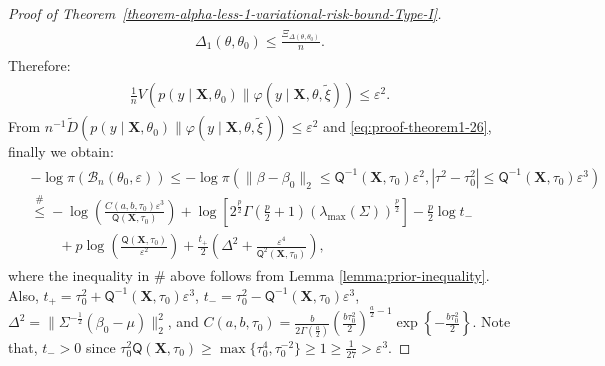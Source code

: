 \documentclass[12pt]{article}
\numberwithin{equation}{section}
\begin{document}
\begin{proof}[Proof of Theorem~\ref{theorem-alpha-less-1-variational-risk-bound-Type-I}]
\begin{align}\label{eq:proof-theorem1-25}
    \begin{split}
        \Delta_1(\theta, \theta_0) \leq \frac{\Xi_{\Delta(\theta, \theta_0)}}{n}.
    \end{split}
\end{align}
Therefore:
\begin{align}\label{eq:proof-theorem1-26}
    \begin{split}
        \frac{1}{n}V\left(p(y\mid \mathbf{X}, \theta_0) \parallel \varphi(y\mid \mathbf{X}, \theta, \tilde{\xi})\right) \leq \varepsilon^2.
    \end{split}
\end{align}
From $n^{-1}\tilde{D}\left(p(y\mid \mathbf{X}, \theta_0) \parallel \varphi(y\mid \mathbf{X}, \theta, \tilde{\xi})\right) \leq \varepsilon^2$ and \eqref{eq:proof-theorem1-26}, finally we obtain:
\begin{align}\label{eq:proof-theorem1-27}
    \begin{split}
        &-\log \pi(\mathcal{B}_n(\theta_0, \varepsilon)) \leq -\log \pi\left(\lVert \beta-\beta_0\rVert_2\leq \mathsf{Q}^{-1}(\mathbf{X}, \tau_0)\varepsilon^2, |\tau^2-\tau_0^2| \leq \mathsf{Q}^{-1}(\mathbf{X}, \tau_0)\varepsilon^{3}\right)\\
        &\stackrel{\#}{\leq} -\log\left(\frac{C(a,b,\tau_0)\varepsilon^3}{\mathsf{Q}(\mathbf{X}, \tau_0)}\right)  + \log\left[2^{\frac{p}{2}}\Gamma\left(\frac{p}{2}+1\right)\left(\lambda_{\mathrm{max}}(\Sigma)\right)^{\frac{p}{2}}\right]- \frac{p}{2}\log t_{-}\\
        &\qquad + p\log\left(\frac{\mathsf{Q}(\mathbf{X}, \tau_0)}{\varepsilon^2}\right) + \frac{t_{+}}{2}\left(\Delta^2 + \frac{\varepsilon^4}{\mathsf{Q}^{2}(\mathbf{X}, \tau_0)}\right),
    \end{split}
\end{align}
where the inequality in $\#$ above follows from Lemma \ref{lemma:prior-inequality}.
Also, $t_+ = \tau_0^2 + \mathsf{Q}^{-1}(\mathbf{X}, \tau_0)\varepsilon^3$, $t_{-} = \tau_0^2 - \mathsf{Q}^{-1}(\mathbf{X}, \tau_0)\varepsilon^3$, $\Delta^{2} = \lVert \Sigma^{-\frac{1}{2}}(\beta_0-\mu)\rVert_{2}^{2}$, and $C(a,b,\tau_0) = \frac{b}{2\Gamma\left(\frac{a}{2}\right)}\left(\frac{b \tau_0^2}{2}\right)^{\frac{a}{2}-1}\exp\left\{-\frac{b\tau_0^2}{2}\right\}$. Note that, $t_{-} > 0$ since $\tau_0^{2}\mathsf{Q}(\mathbf{X}, \tau_0) \geq \max\{\tau_0^{4}, \tau_0^{-2}\}\geq 1 \geq \tfrac{1}{27} > \varepsilon^{3}$.


\end{proof}
\end{document}
